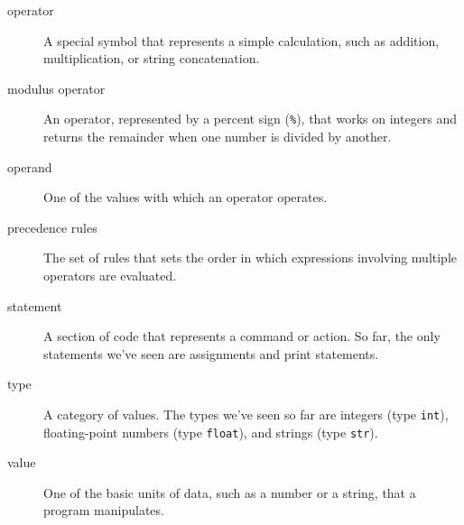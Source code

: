 \begin{description}
\item[operator]
A special symbol that represents a simple calculation, such as addition, multiplication, or string concatenation.
\end{description}


\begin{description}
\item[modulus operator]
An operator, represented by a percent sign (\texttt{\%}), that works on integers and returns the remainder when one number is divided by another.
\end{description}

 

\begin{description}
\item[operand]
One of the values with which an operator operates.
\end{description}


\begin{description}
\item[precedence rules]
The set of rules that sets the order in which expressions involving multiple operators are evaluated.
\end{description}

 

\begin{description}
\item[statement]
A section of code that represents a command or action. So far, the only statements we've seen are assignments and print statements.
\end{description}


\begin{description}
\item[type]
A category of values. The types we've seen so far are integers (type \texttt{int}), floating-point numbers (type \texttt{float}), and strings (type \texttt{str}).
\end{description}


\begin{description}
\item[value]
One of the basic units of data, such as a number or a string, that a program manipulates.
\end{description}


